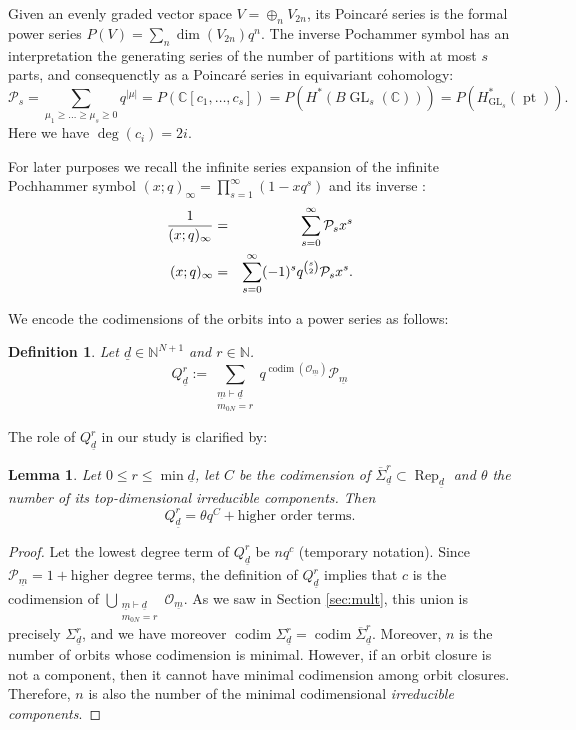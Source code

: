 \documentclass[a4paper]{amsart}
\DeclareMathOperator{\pt}{pt}
\DeclareMathOperator{\Rep}{\mathrm{Rep}}
\DeclareMathOperator{\codim}{\mathrm{codim}}
\DeclareMathOperator{\GL}{\mathrm{GL}}
\newcommand{\C}{\mathbb{C}}
\newcommand{\N}{\mathbb{N}}
\newcommand{\CO}{\mathcal{O}}
\newcommand{\CP}{\mathcal{P}}
\newcommand{\um}{\underline{m}}
\newcommand{\ud}{\underline{d}}
\newcommand{\cSigma}{\overline{\Sigma}}
\newtheorem{lemma}[thm]{Lemma}
\newtheorem{defn}[thm]{Definition}
\theoremstyle{plain}
\begin{document}
% 
Given an evenly graded vector space $V=\oplus_n V_{2n}$, its Poincar\'e series is the formal power series $P(V)=\sum_n \dim(V_{2n}) q^n$. The inverse Pochammer symbol has an interpretation the generating series of the number of partitions with at most $s$ parts, and consequenctly as a Poincar\'e series in equivariant cohomology:
\[
\CP_s=\sum_{\mu_1\geq\ldots\geq \mu_s\geq 0} q^{|\mu|}=
P(\C[c_1,\ldots,c_s])=
P( H^*(B\!\GL_s(\C))) = P( H^*_{\GL_s}(\pt)).
\]
Here we have $\deg(c_i)=2i$. 

For later purposes we recall the infinite series expansion of the infinite Pochhammer symbol $(x;q)_{\infty}=\prod_{s=1}^\infty (1-xq^s)$ and its inverse %
\cite[Cor.~10.2.2]{special}: 
\begin{eqnarray} \notag
    \frac{1}{(x;q)_{\infty}}  &=& \sum_{s=0}^\infty \CP_s x^s \\
    \label{eqn:Ps_inverse}
    (x;q)_{\infty}  &=& \sum_{s=0}^\infty (-1)^s q^{\binom{s}{2}}\CP_s x^s.
\end{eqnarray}

We encode the codimensions of the orbits into a power series as follows:

\begin{defn}
Let $\ud\in \N^{N+1}$ and $r\in \N$.
\[Q_{\ud}^r:=\sum_{\substack{ \um \vdash \ud \\ m_{0N}=r}} q^{\codim(\CO_{\um})} \CP_{\um}\]
\end{defn}

The role of $Q_{\ud}^r$ in our study is clarified by:

\begin{lemma}\label{lem:Qs_codim}
     Let $0\leq r\leq\min\ud$, let $C$ be the codimension of $\cSigma^r_{\ud} \subset \Rep_{\ud}$ and $\theta$ the number of its top-dimensional irreducible components. Then  
    \[Q^r_{\ud}=\theta q^C+\text{higher order terms}.\]
\end{lemma}
\begin{proof}
       Let the lowest degree term of $Q^r_{\ud}$ be $nq^c$ (temporary notation). Since $\CP_{\um}=1+$higher degree terms, the definition of $Q^r_{\ud}$ implies that $c$ is the codimension of 
    $\bigcup_{\substack{ \um \vdash \ud \\ m_{0N}=r}} \CO_{\um}$. As we saw in Section \ref{sec:mult}, this union is precisely $\Sigma^r_{\ud}$, and we have moreover $\codim \Sigma^r_{\ud}=\codim \cSigma^r_{\ud}$. Moreover, $n$ is the number of orbits whose codimension is minimal. However, if an orbit closure is not a component, then it cannot have minimal codimension among orbit closures. Therefore, $n$ is also the number of the minimal codimensional {\em irreducible components}.
\end{proof}
\end{document}
